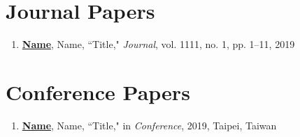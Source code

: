 
\begin{publications}
    \section*{Journal Papers}
    \begin{spacing}{1}
        \begin{enumerate}
            \item {\bf \underline{Name}}, Name, ``Title," \textit{Journal}, vol. 1111, no. 1, pp. 1--11, 2019
        \end{enumerate}
    \end{spacing}
    
    \section*{Conference Papers}
    \begin{spacing}{1}
        \begin{enumerate}
            \item {\bf \underline{Name}}, Name, ``Title," in \textit{Conference}, 2019, Taipei, Taiwan
        \end{enumerate}
    \end{spacing}
    
\end{publications}
    